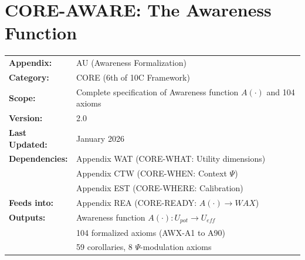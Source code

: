 %

\chapter{CORE-AWARE: The Awareness Function}
\label{app:core-aware}
\label{app:bcm-axiom-formalization}  %


\begin{tcolorbox}[colback=blue!5!white, colframe=blue!75!black,
    title=\textbf{Appendix AWA: CORE-AWARE}]

\begin{tabular}{@{}ll@{}}
\textbf{Appendix:} & AU (Awareness Formalization) \\
\textbf{Category:} & CORE (6th of 10C Framework) \\
\textbf{Scope:} & Complete specification of Awareness function $A(\cdot)$ and 104 axioms \\
\textbf{Version:} & 2.0 \\
\textbf{Last Updated:} & January 2026 \\
\textbf{Dependencies:} & Appendix WAT (CORE-WHAT: Utility dimensions) \\
                       & Appendix CTW (CORE-WHEN: Context $\Psi$) \\
                       & Appendix EST (CORE-WHERE: Calibration) \\
\textbf{Feeds into:}   & Appendix REA (CORE-READY: $A(\cdot) \to WAX$) \\
\textbf{Outputs:} & Awareness function $A(\cdot): U_{pot} \to U_{eff}$ \\
                  & 104 formalized axioms (AWX-A1 to A90) \\
                  & 59 corollaries, 8 $\Psi$-modulation axioms \\
\end{tabular}

\end{tcolorbox}

